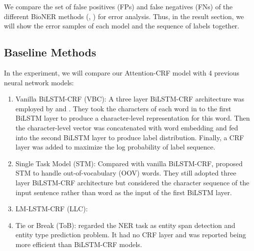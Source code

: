 We compare the set of false positives (FPs) and false negatives (FNs) of the different BioNER methods (\citet{habibi2017deep}, \citet{wang2018cross}) for error analysis. Thus, in the result section, we will show the error samples of each model and the sequence of labels together.

\subsection{Baseline Methods}
In the experiment, we will compare our Attention-CRF model with 4 previous neural network models:
\begin{enumerate}
    \item Vanilla BiLSTM-CRF (VBC): A three layer BiLSTM-CRF architecture was employed by \citet{lample2016neural} and \citet{habibi2017deep}. They took the characters of each word in to the first BiLSTM layer to produce a character-level representation for this word. Then the character-level vector was concatenated with word embedding and fed into the second BiLSTM layer to produce label distribution. Finally, a CRF layer was added to maximize the log probability of label sequence.
    \item Single Task Model (STM): Compared with vanilla BiLSTM-CRF, \citet{wang2018cross} proposed STM to handle out-of-vocabulary (OOV) words. They still adopted three layer BiLSTM-CRF architecture but considered the character sequence of the input sentence rather than word as the input of the first BiLSTM layer.
    \item LM-LSTM-CRF (LLC):
    \item Tie or Break (ToB): \citet{shang2018learning} regarded the NER task as entity span detection and entity type prediction problem. It had no CRF layer and was reported being more efficient than BiLSTM-CRF models.
\end{enumerate}